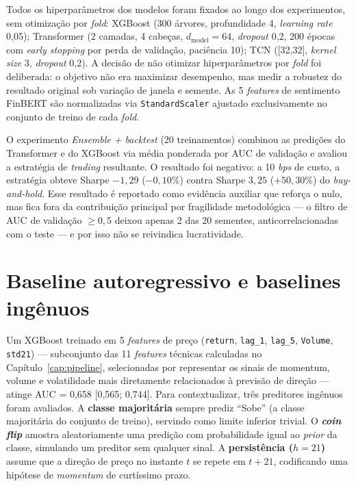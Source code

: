 Todos os hiperparâmetros dos modelos foram fixados ao longo dos experimentos, sem otimização por \textit{fold}: XGBoost (300 árvores, profundidade 4, \textit{learning rate} 0,05); Transformer (2 camadas, 4 cabeças, $d_\text{model}=64$, \textit{dropout} 0,2, 200 épocas com \textit{early stopping} por perda de validação, paciência 10); TCN ([32,32], \textit{kernel size} 3, \textit{dropout} 0,2). A decisão de não otimizar hiperparâmetros por \textit{fold} foi deliberada: o objetivo não era maximizar desempenho, mas medir a robustez do resultado original sob variação de janela e semente. As 5 \textit{features} de sentimento FinBERT são normalizadas via \texttt{StandardScaler} ajustado exclusivamente no conjunto de treino de cada \textit{fold}.

O experimento \textit{Ensemble + backtest} (20 treinamentos) combinou as predições do Transformer e do XGBoost via média ponderada por AUC de validação e avaliou a estratégia de \textit{trading} resultante. O resultado foi negativo: a 10 \textit{bps} de custo, a estratégia obteve Sharpe $-1{,}29$ ($-0{,}10\%$) contra Sharpe $3{,}25$ ($+50{,}30\%$) do \textit{buy-and-hold}. Esse resultado é reportado como evidência auxiliar que reforça o nulo, mas fica fora da contribuição principal por fragilidade metodológica --- o filtro de AUC de validação $\geq 0{,}5$ deixou apenas 2 das 20 sementes, anticorrelacionadas com o teste --- e por isso não se reivindica lucratividade.

\section{Baseline autoregressivo e baselines ingênuos}

Um XGBoost \cite{chen2016} treinado em 5 \textit{features} de preço (\texttt{return}, \texttt{lag\_1}, \texttt{lag\_5}, \texttt{Volume}, \texttt{std21}) --- subconjunto das 11 \textit{features} técnicas calculadas no Capítulo~\ref{cap:pipeline}, selecionadas por representar os sinais de momentum, volume e volatilidade mais diretamente relacionados à previsão de direção --- atinge AUC = 0,658 [0,565; 0,744]. Para contextualizar, três preditores ingênuos foram avaliados. A \textbf{classe majoritária} sempre prediz ``Sobe'' (a classe majoritária do conjunto de treino), servindo como limite inferior trivial. O \textbf{\textit{coin flip}} amostra aleatoriamente uma predição com probabilidade igual ao \textit{prior} da classe, simulando um preditor sem qualquer sinal. A \textbf{persistência ($h=21$)} assume que a direção de preço no instante $t$ se repete em $t+21$, codificando uma hipótese de \textit{momentum} de curtíssimo prazo.

